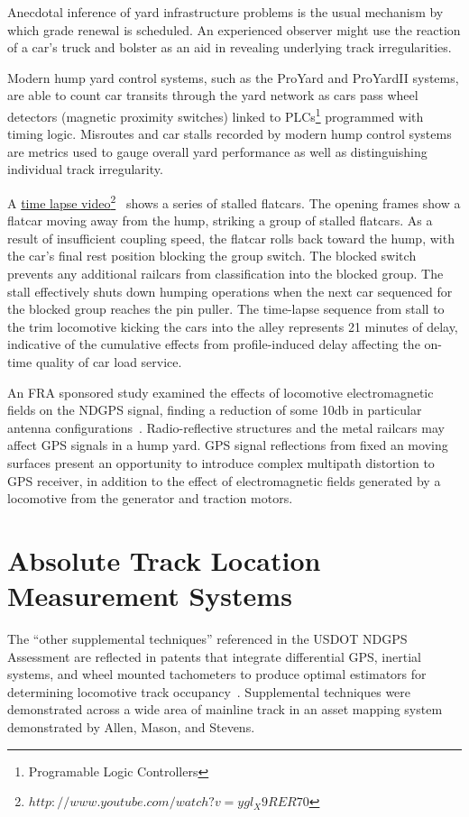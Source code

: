 Anecdotal inference of yard infrastructure problems is the usual mechanism by which grade renewal is scheduled. An experienced observer might use the reaction of a car's truck and bolster as an aid in revealing underlying track irregularities.

Modern hump yard control systems, such as the ProYard and ProYardII systems, are able to count car transits through the yard network as cars pass wheel detectors (magnetic proximity switches) linked to  PLCs\footnote{Programable Logic Controllers} programmed with timing logic. Misroutes and car stalls recorded by modern hump control systems are metrics used to gauge overall yard performance as well as distinguishing individual track irregularity.

A \href{http://www.youtube.com/watch?v=ygl_X9RER70}{time lapse video}\footnote{$http://www.youtube.com/watch?v=ygl_X9RER70$}~\citep{CarStallVid} shows a series of stalled flatcars. The opening frames show a flatcar moving away from the hump, striking a group of stalled flatcars. As a result of insufficient coupling speed, the flatcar rolls back toward the hump, with the car's final rest position blocking the group switch. The blocked switch prevents any additional railcars from classification into the blocked group. The stall effectively shuts down humping operations when the next car sequenced for the blocked group reaches the pin puller. The time-lapse sequence from stall to the trim locomotive kicking the cars into the alley represents 21 minutes of delay, indicative of the cumulative effects from profile-induced delay affecting the on-time quality of car load service.

An FRA sponsored study examined the effects of locomotive electromagnetic fields on the NDGPS signal, finding a reduction of some 10db in particular antenna configurations~\citep{2000FRA_gps_ant}. Radio-reflective structures and the metal railcars may affect GPS signals in a hump yard. GPS signal reflections from fixed an moving surfaces present an opportunity to introduce complex multipath distortion to GPS receiver, in addition to the effect of electromagnetic fields generated by a locomotive from the generator and traction motors.

\section{Absolute Track Location Measurement Systems}
The ``other supplemental techniques'' referenced in the USDOT NDGPS Assessment are reflected in patents that integrate differential GPS, inertial systems, and wheel mounted tachometers to produce optimal estimators for determining locomotive track occupancy~\citep{2007lockheed}. Supplemental techniques were demonstrated across a wide area of mainline track in an asset mapping system demonstrated by Allen, Mason, and Stevens.

